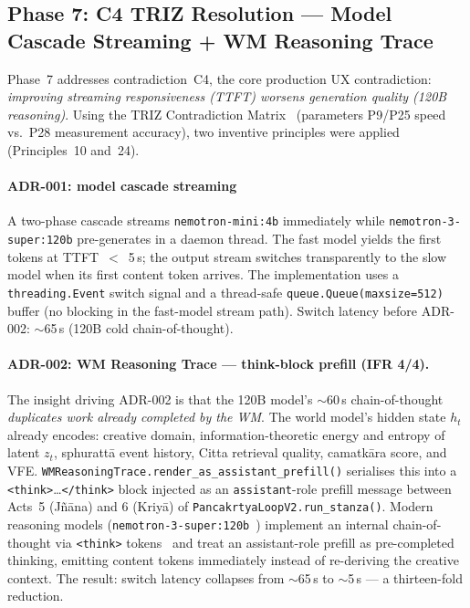 \documentclass[journal,onecolumn,11pt]{IEEEtran}
\begin{document}
\subsection{Phase 7: C4 TRIZ Resolution — Model Cascade Streaming + WM Reasoning Trace}\label{sec:phase7}

Phase~7 addresses contradiction~C4, the core production UX contradiction:
\emph{improving streaming responsiveness (TTFT) worsens generation quality
(120B reasoning)}.
Using the TRIZ Contradiction Matrix~\cite{altshuller1996innovinnovation,savransky2000engineering}
(parameters P9/P25 speed vs.\ P28 measurement accuracy),
two inventive principles were applied (Principles~10 and~24).

\paragraph{ADR-001: model cascade streaming}
A two-phase cascade streams
\texttt{nemotron-mini:4b} immediately while \texttt{nemotron-3-super:120b}
pre-generates in a daemon thread.
The fast model yields the first tokens at TTFT~$<$~5\,s;
the output stream switches transparently to the slow model
when its first content token arrives.
The implementation uses a \texttt{threading.Event} switch signal and a
thread-safe \texttt{queue.Queue(maxsize=512)} buffer (no blocking in the
fast-model stream path).
Switch latency before ADR-002: $\sim$65\,s (120B cold chain-of-thought).

\paragraph{ADR-002: WM Reasoning Trace — think-block prefill (IFR 4/4).}
The insight driving ADR-002 is that the 120B model's $\sim$60\,s
chain-of-thought \emph{duplicates work already completed by the WM}.
The world model's hidden state $h_t$ already encodes: creative domain,
information-theoretic energy and entropy of latent $z_t$,
sphurattā event history, Citta retrieval quality,
camatkāra score, and VFE.
\texttt{WMReasoningTrace.render\_as\_assistant\_prefill()} serialises
this into a \texttt{<think>}\ldots\texttt{</think>} block injected as an
\texttt{assistant}-role prefill message between Acts~5 (Jñāna) and 6 (Kriyā)
of \texttt{PancakrtyaLoopV2.run\_stanza()}.
Modern reasoning models (\texttt{nemotron-3-super:120b}~\cite{nemotron2024})
implement an internal chain-of-thought via \texttt{<think>} tokens~\cite{guo2025deepseek,wei2022cot}
and treat an assistant-role prefill as pre-completed thinking, emitting
content tokens immediately instead of re-deriving the creative context.
The result: switch latency collapses from $\sim$65\,s to $\sim$5\,s — a
thirteen-fold reduction.
\end{document}
